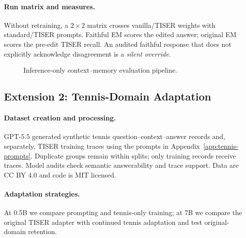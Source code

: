 \documentclass[conference]{IEEEtran}
\begin{document}
\paragraph{Run matrix and measures.}
Without retraining, a $2\times2$ matrix crosses vanilla/TISER weights with standard/TISER prompts. Faithful EM scores the edited answer; original EM scores the pre-edit TISER recall. An audited faithful response that does not explicitly acknowledge disagreement is a \emph{silent override}.

\begin{figure}[t]
\centering
{}
\caption{Inference-only context--memory evaluation pipeline.}
\label{fig:pipeline}
\end{figure}

\subsection{Extension 2: Tennis-Domain Adaptation}

\paragraph{Dataset creation and processing.}
GPT-5.5 generated synthetic tennis question--context--answer records and, separately, TISER training traces using the prompts in Appendix~\ref{app:tennis-prompts}. Duplicate groups remain within splits; only training records receive traces. Model audits check semantic answerability and trace support. Data are CC BY 4.0 and code is MIT licensed.

\paragraph{Adaptation strategies.}
At 0.5B we compare prompting and tennis-only training; at 7B we compare the original TISER adapter with continued tennis adaptation and test original-domain retention.
\end{document}
